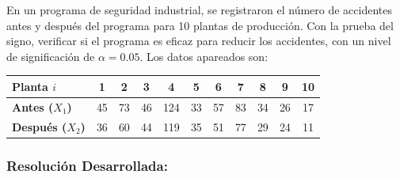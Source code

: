 \documentclass[11pt,a4paper]{article}
\begin{document}
\begin{tcolorbox}[colback=white,colframe=blue!60!black,title=Enunciado]
    En un programa de seguridad industrial, se registraron el número de accidentes antes y después del programa para 10 plantas de producción. Con la prueba del signo, verificar si el programa es eficaz para reducir los accidentes, con un nivel de significación de $\alpha = 0.05$. Los datos apareados son:
    \begin{center}
    \begin{tabular}{l cccccccccc}
        \toprule
        \textbf{Planta $i$} & 1 & 2 & 3 & 4 & 5 & 6 & 7 & 8 & 9 & 10 \\
        \midrule
        \textbf{Antes ($X_1$)} & 45 & 73 & 46 & 124 & 33 & 57 & 83 & 34 & 26 & 17 \\
        \textbf{Después ($X_2$)} & 36 & 60 & 44 & 119 & 35 & 51 & 77 & 29 & 24 & 11 \\
        \bottomrule
    \end{tabular}
    \end{center}
\end{tcolorbox}

\subsubsection*{Resolución Desarrollada:}
\end{document}
